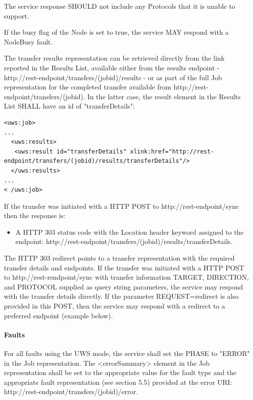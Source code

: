\documentclass[11pt,a4paper]{ivoa}
\begin{document}
The service response SHOULD not include any Protocols that it is unable to support.

If the busy flag of the Node is set to true, the service MAY respond with a NodeBusy fault.

The transfer results representation can be retrieved directly from the link reported in the Results List, available either from the results endpoint - http://rest-endpoint/transfers/(jobid)/results - or as part of the full Job representation for the completed transfer available from http://rest-endpoint/transfers/(jobid). In the latter case, the result element in the Results List SHALL have an id of "transferDetails":
\begin{lstlisting}
<uws:job>
...
  <uws:results>
   <uws:result id="transferDetails" xlink:href="http://rest-endpoint/transfers/(jobid)/results/transferDetails"/>
  </uws:results>
...
< /uws:job>
\end{lstlisting}
If the transfer was initiated with a HTTP POST to http://rest-endpoint/sync then the response is:
\begin{itemize}
    \item A HTTP 303 status code with the Location header keyword assigned to the endpoint: http://rest-endpoint/transfers/(jobid)/results/transferDetails.
\end{itemize}
The HTTP 303 redirect points to a transfer representation with the required transfer details and endpoints.
If the transfer was initiated with a HTTP POST to http://rest-rendpoint/sync with transfer information TARGET, DIRECTION, and PROTOCOL supplied as query string parameters, the service may respond with the transfer details directly. If the parameter REQUEST=redirect is also provided in this POST, then the service may respond with a redirect to a preferred endpoint (example below).

\paragraph{Faults}
For all faults using the UWS mode, the service shall set the PHASE to "ERROR" in the Job representation. The <errorSummary> element in the Job representation shall be set to the appropriate value for the fault type and the appropriate fault representation (see section 5.5) provided at the error URI: http://rest-endpoint/transfers/(jobid)/error.
\end{document}
